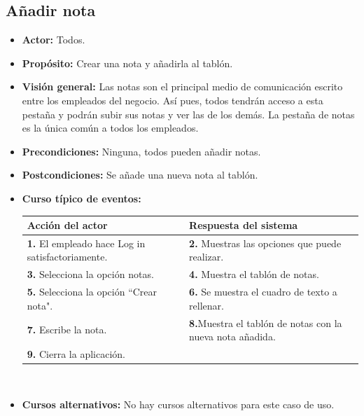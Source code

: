 \documentclass[spanish,a4paper,11pt, twoside]{report}	%
\begin{document}
	\subsection{Añadir nota} 
			\begin{itemize}
			\item \textbf{Actor:} Todos.
			\item \textbf{Propósito:} Crear una nota y añadirla al tablón.
			\item \textbf{Visión general:} Las notas son el principal medio de comunicación escrito entre los empleados del negocio. 		Así pues, todos tendrán acceso a esta pestaña y podrán subir sus notas y ver las de los demás. La pestaña de notas es la única común a todos los empleados.
			\item \textbf{Precondiciones:} Ninguna, todos pueden añadir notas.
			\item \textbf{Postcondiciones:} Se añade una nueva nota al tablón.
			\item \textbf{Curso típico de eventos:} 	\\
				\begin{tabular}{|p{6cm}||p{6cm}|}
				\hline
				\textbf{Acción del actor} & \textbf{Respuesta del sistema} \\ \hline \hline
				\textbf{1.}    El empleado hace Log in satisfactoriamente. & \textbf{2.} Muestras las opciones que puede realizar. \\ \hline
				\textbf{3.} Selecciona la opción notas. & \textbf{4.} Muestra el tablón de notas. \\ \hline
				\textbf{5.} Selecciona la opción “Crear nota".	& \textbf{6.} Se muestra el cuadro de texto a rellenar. \\ \hline
				\textbf{7.} Escribe la nota.	& \textbf{8.}Muestra el tablón de notas con la nueva nota añadida. \\ \hline
				\textbf{9.} Cierra la aplicación. &  \\ \hline
			\end{tabular}
			\\
			\item \textbf{Cursos alternativos:} No hay cursos alternativos para este caso de uso.
		\end {itemize}


\end{document}
